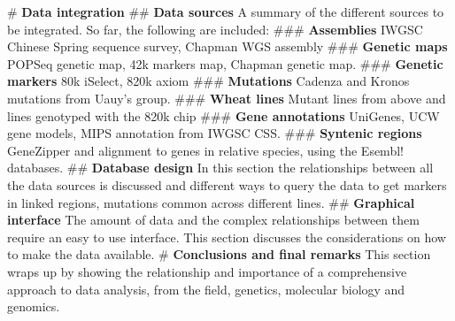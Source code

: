 \documentclass[10pt,a4paper]{article}
\begin{document}
\begin{easylist}
	# \textbf{Data integration}  
	## \textbf{Data sources} A summary of the different sources to be integrated. So far, the following are included:
	### \textbf{Assemblies} IWGSC Chinese Spring sequence survey, Chapman WGS assembly
	### \textbf{Genetic maps} POPSeq genetic map, 42k markers map, Chapman genetic map. 
	### \textbf{Genetic markers} 80k iSelect, 820k axiom
	### \textbf{Mutations} Cadenza and Kronos mutations from Uauy's group.
	### \textbf{Wheat lines} Mutant lines from above and lines genotyped with the 820k chip  
	### \textbf{Gene annotations} UniGenes, UCW gene models, MIPS annotation from IWGSC CSS.              
	### \textbf{Syntenic regions} GeneZipper and alignment to genes in relative species, using the Esembl! databases. 
	## \textbf{Database design} In this section the relationships between all the data sources is discussed and different ways to query the data to get markers in linked regions, mutations common across different lines.
	## \textbf{Graphical interface} The amount of data and the complex relationships between them require an easy to use interface. This section discusses the considerations on how to make the data available.
	# \textbf{Conclusions and final remarks} This section wraps up by showing the relationship and importance of a comprehensive approach to data analysis, from the field, genetics, molecular biology and genomics. 
\end{easylist}
\end{document}
